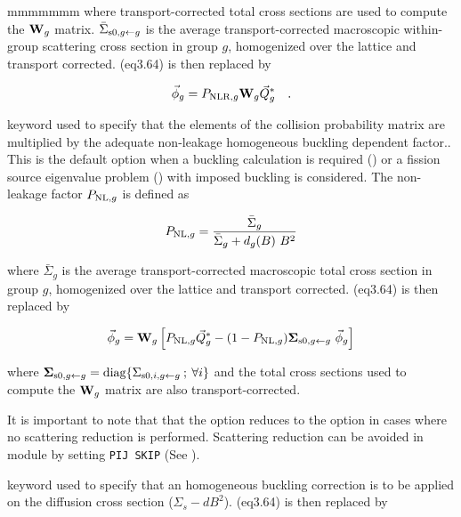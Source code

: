 \begin{ListeDeDescription}{mmmmmmm}
\noindent where transport-corrected total
cross sections are used to compute the ${\bf W}_g$ matrix. $\bar\Sigma_{{\rm s0},g \gets g}$ is the average
transport-corrected macroscopic within-group scattering cross section in group $g$,
homogenized over the lattice and transport corrected. \eq(eq3.64) is then replaced by
 
\begin{equation}
\vec\phi_g=P_{{\rm NLR},g} {\bf W}_g \vec Q^*_g \ \ \ .
\label{eq:eq5.36}
\end{equation}

\item[\moc{PNL}] keyword used to specify that the elements of the collision
probability matrix
are multiplied by the adequate non-leakage homogeneous buckling dependent
factor.\cite{ALSB1}. This is the default option when a buckling
calculation is required () or a fission source eigenvalue problem ()
with imposed buckling is considered. The non-leakage
factor $P_{{\rm NL},g}$ is defined as

\begin{equation}
P_{{\rm NL},g}={\bar\Sigma_g\over{\bar\Sigma_g+d_g(B) \ B^2}}
\end{equation}

\noindent where $\bar\Sigma_g$ is the average transport-corrected macroscopic total cross section
in group $g$, homogenized over the lattice and transport corrected. \eq(eq3.64) is then replaced by

\begin{equation}
\vec\phi_g={\bf W}_g \left[ P_{{\rm NL},g} \vec Q^*_g -(1-P_{{\rm NL},g}) {\bf \Sigma}_{{\rm s0},g\gets g} \ \vec\phi_g \right]
\label{eq:eq5.33b}
\end{equation}

\noindent where ${\bf \Sigma}_{{\rm s0},g\gets g}={\rm diag} \{ \Sigma_{{\rm s0},i,g \gets g}\> ;\> \forall i \}$
and the total cross sections used to compute the ${\bf W}_g$ matrix are also
transport-corrected.

\vskip 0.02cm

\noindent It is important to note that that the  option reduces to the  option in
cases where no scattering reduction is performed. Scattering reduction can be avoided in module
 by setting {\tt PIJ SKIP} (See ).

\item[\moc{SIGS}] keyword used to specify that an homogeneous buckling
correction is to be applied on the diffusion cross section ($\Sigma_{s} -
dB^{2}$). \eq(eq3.64) is then replaced by


\end{ListeDeDescription}
